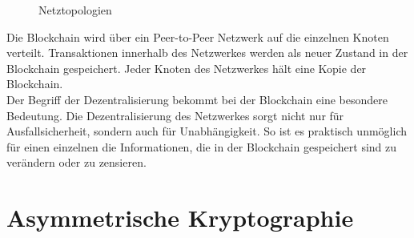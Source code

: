 \begin{figure}[H]
\caption{Netztopologien} 
\label{net}
\end{figure}

Die Blockchain wird über ein Peer-to-Peer Netzwerk auf die einzelnen Knoten verteilt. Transaktionen innerhalb des Netzwerkes werden als neuer Zustand in der Blockchain gespeichert. Jeder Knoten des Netzwerkes hält eine Kopie der Blockchain. \\
Der Begriff der Dezentralisierung bekommt bei der Blockchain eine besondere Bedeutung. Die Dezentralisierung des Netzwerkes sorgt nicht nur für Ausfallsicherheit, sondern auch für Unabhängigkeit. So ist es praktisch unmöglich für einen einzelnen die Informationen, die in der Blockchain gespeichert sind zu verändern oder zu zensieren.
		
	
	\section{Asymmetrische Kryptographie}
		
